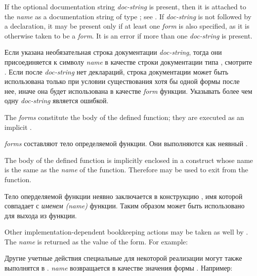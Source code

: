 \begin{defmac}
\newpage%

If the optional documentation string \textit{doc-string} is present,
then it is attached to the \textit{name}
as a documentation string of type ; see .
If \textit{doc-string} is not
followed by a declaration, it may be
present only if at least one \textit{form} is also specified, as it is
otherwise taken to be a \textit{form}.
It is an error if more than one \textit{doc-string} is present.

Если указана необязательная строка документации \textit{doc-string}, тогда они
присоединяется к символу \textit{name} в качестве строки документации типа
, смотрите . Если после \textit{doc-string} нет
деклараций, строка документации может быть использована только при условии
существования хотя бы одной формы после нее, иначе она будет использована в
качестве \textit{form} функции. Указывать более чем одну \textit{doc-string} является ошибкой.

The \textit{forms} constitute the body of the defined function; they are
executed as an implicit .

\textit{forms} составляют тело определяемой функции. Они выполняются как неявный .

The body of the defined function is implicitly enclosed
in a  construct whose name is the same as the \textit{name}
of the function.  Therefore 
may be used to exit from the function.

Тело оперделяемой функции неявно заключается в конструкцию , имя
которой совпадает с \textit{именем (name)} функции. Таким образом
 может быть использовано для выхода из функции.

Other implementation-dependent bookkeeping actions may be taken as well
by .  The \textit{name} is returned as the value of the 
form.
For example:

Другие учетные действия специальные для некоторой реализации могут также
выполнятся в . \textit{name} возвращается в качестве значения формы
.
Например:


\end{defmac}

